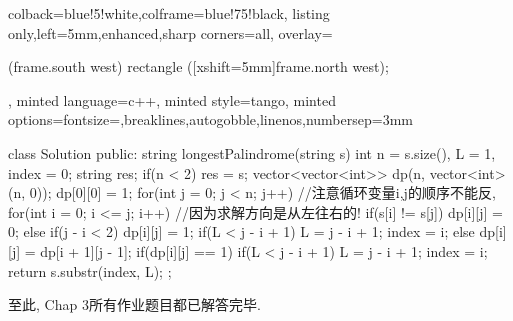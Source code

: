 \documentclass{article}
\begin{document}
\begin{homeworkProblem}
\begin{tcblisting}
{colback=blue!5!white,colframe=blue!75!black,
listing only,left=5mm,enhanced,sharp corners=all,
overlay={\begin{tcbclipinterior} (frame.south west)
rectangle ([xshift=5mm]frame.north west);\end{tcbclipinterior}},
minted language=c++,
minted style=tango,
minted options={fontsize=\small,breaklines,autogobble,linenos,numbersep=3mm}}
class Solution {
public:
    string longestPalindrome(string s) {
        int n = s.size(), L = 1, index = 0;
        string res;
        if(n < 2) res = s;
        vector<vector<int>> dp(n, vector<int>(n, 0));
        dp[0][0] = 1;
        for(int j = 0; j < n; j++) {  //注意循环变量i,j的顺序不能反,
            for(int i = 0; i <= j; i++) {  //因为求解方向是从左往右的!
                if(s[i] != s[j]) {
                    dp[i][j] = 0;
                }
                else {
                    if(j - i < 2) {
                        dp[i][j] = 1;
                        if(L < j - i + 1) {
                            L = j - i + 1;
                            index = i;
                        }
                    }
                    else {
                        dp[i][j] = dp[i + 1][j - 1];
                        if(dp[i][j] == 1) {
                            if(L < j - i + 1) {
                                L = j - i + 1;
                                index = i;
                            }
                        }
                    }
                }
            }
        }
        return s.substr(index, L);
    }
};
\end{tcblisting}
    至此, Chap 3所有作业题目都已解答完毕.
\end{homeworkProblem}




\end{document}

